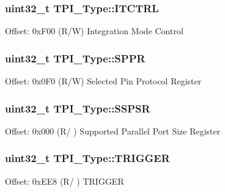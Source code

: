 \subsubsection[{\texorpdfstring{I\+T\+C\+T\+RL}{ITCTRL}}]{ uint32\+\_\+t T\+P\+I\+\_\+\+Type\+::\+I\+T\+C\+T\+RL}\hypertarget{struct_t_p_i___type_ab49c2cb6b5fe082746a444e07548c198}{}\label{struct_t_p_i___type_ab49c2cb6b5fe082746a444e07548c198}
Offset\+: 0x\+F00 (R/W) Integration Mode Control 
\subsubsection[{\texorpdfstring{S\+P\+PR}{SPPR}}]{ uint32\+\_\+t T\+P\+I\+\_\+\+Type\+::\+S\+P\+PR}\hypertarget{struct_t_p_i___type_a3eb655f2e45d7af358775025c1a50c8e}{}\label{struct_t_p_i___type_a3eb655f2e45d7af358775025c1a50c8e}
Offset\+: 0x0\+F0 (R/W) Selected Pin Protocol Register 
\subsubsection[{\texorpdfstring{S\+S\+P\+SR}{SSPSR}}]{ uint32\+\_\+t T\+P\+I\+\_\+\+Type\+::\+S\+S\+P\+SR}\hypertarget{struct_t_p_i___type_a158e9d784f6ee6398f4bdcb2e4ca0912}{}\label{struct_t_p_i___type_a158e9d784f6ee6398f4bdcb2e4ca0912}
Offset\+: 0x000 (R/ ) Supported Parallel Port Size Register 
\subsubsection[{\texorpdfstring{T\+R\+I\+G\+G\+ER}{TRIGGER}}]{ uint32\+\_\+t T\+P\+I\+\_\+\+Type\+::\+T\+R\+I\+G\+G\+ER}\hypertarget{struct_t_p_i___type_aa4b603c71768dbda553da571eccba1fe}{}\label{struct_t_p_i___type_aa4b603c71768dbda553da571eccba1fe}
Offset\+: 0x\+E\+E8 (R/ ) T\+R\+I\+G\+G\+ER 

